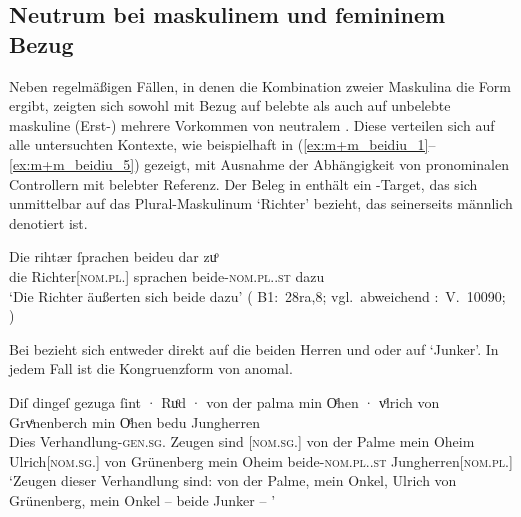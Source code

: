 
\subsection{Neutrum bei maskulinem und femininem Bezug}
\label{subsec:m+m_anim_beidiu}

Neben regelmäßigen Fällen, in denen die Kombination zweier Maskulina die Form
 ergibt, zeigten sich sowohl mit Bezug auf belebte als
auch auf unbelebte maskuline (Erst-) mehrere Vorkommen von
neutralem . Diese verteilen sich auf alle untersuchten Kontexte,
wie beispielhaft in (\ref{ex:m+m_beidiu_1}--\ref{ex:m+m_beidiu_5}) gezeigt, mit
Ausnahme der Abhängigkeit von pronominalen
Controllern mit belebter Referenz. Der Beleg in
 enthält ein -Target, das sich unmittelbar
auf das Plural-Maskulinum  `Richter' bezieht, das seinerseits
männlich denotiert ist.

\begin{exe}
\ex \label{ex:m+m_beidiu_1}
	\gll Die rihtær ſprachen beideu {dar zuͦ} \\
		die Richter[\textsc{nom.pl.\MascM}] sprachen
		beide-\textsc{nom.pl.\NeutM.st} dazu \\
	\trans `Die Richter äußerten sich beide dazu'
		(%
			B1:~28ra,8; vgl.~abweichend
			\KC:~V.~10090;
			\cite[267]{schroeder1895}%
		)
\end{exe}

Bei  bezieht sich  entweder direkt auf die
beiden Herren  und 
oder auf  `Junker'. In jedem Fall ist die Kongruenzform von
 anomal.

\begin{exe}
\ex \label{ex:m+m_beidiu_3}
	\gll Diſ dingeſ gezuga ſint · Ruͦd · von der palma min Oͤhen · vͦlrich
			von Grvͤnenberch min Oͤhen bedu Jungherren \textelp{} \\
		Dies Verhandlung-\textsc{gen.sg.\NeutI} Zeugen sind {}
			[\textsc{nom.sg.\MascM}] {} von der Palme mein Oheim
			{} Ulrich[\textsc{nom.sg.\MascM}] von Grünenberg mein Oheim
			beide-\textsc{nom.pl.\NeutM.st}
			Jungherren[\textsc{nom.pl.\MascM}] {} \\
	\trans `Zeugen dieser Verhandlung sind:  von der Palme,
		mein Onkel, Ulrich von Grünenberg, mein Onkel -- beide Junker --
		\textelp{}'
		\parencites(Nr.~2915, Kl.~St.~Urban, Kt.~Luzern, 1298)[213,33--35]{cao4}
\end{exe}

